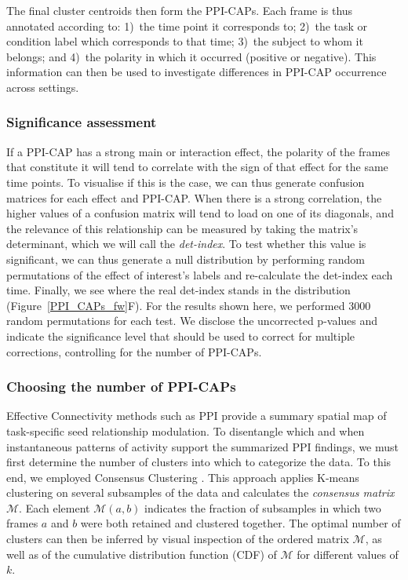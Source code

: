 The final cluster centroids then form the PPI-CAPs.
Each frame is thus annotated according to: 1)~the time point it corresponds to; 2)~the task or condition label which corresponds to that time; 3)~the subject to whom it belongs; and 4)~the polarity in which it occurred (positive or negative). This information can then be used to investigate differences in PPI-CAP occurrence across settings. 

\subsubsection{Significance assessment}
If a PPI-CAP has a strong main or interaction effect, the polarity of the frames that constitute it will tend to correlate with the sign of that effect for the same time points. To visualise if this is the case, we can thus generate confusion matrices for each effect and PPI-CAP. When there is a strong correlation, the higher values of a confusion matrix will tend to load on one of its diagonals, and the relevance of this relationship can be measured by taking the matrix's determinant, which we will call the \textit{det-index}. To test whether this value is significant, we can thus generate a null distribution by performing random permutations of the effect of interest's labels and re-calculate the det-index each time. Finally, we see where the real det-index stands in the distribution (Figure~\ref{PPI_CAPs_fw}F).
For the results shown here, we performed 3000 random permutations for each test. We disclose the uncorrected p-values and indicate the significance level that should be used to correct for multiple corrections, controlling for the number of PPI-CAPs.


\subsubsection{Choosing the number of PPI-CAPs}
Effective Connectivity methods such as PPI provide a summary spatial map of task-specific seed relationship modulation. To disentangle which and when instantaneous patterns of activity support the summarized PPI findings, we must first determine the number of clusters into which to categorize the data. To this end, we employed Consensus Clustering \citep{Monti2003}. This approach applies K-means clustering on several subsamples of the data and calculates the \textit{consensus matrix} $\mathcal{M}$. Each element $\mathcal{M}(a,b)$ indicates the fraction of subsamples in which two frames $a$ and $b$ were both retained and clustered together. The optimal number of clusters can then be inferred by visual inspection of the ordered matrix $\mathcal{M}$, as well as of the cumulative distribution function (CDF) of $\mathcal{M}$  for different values of $k$.  

